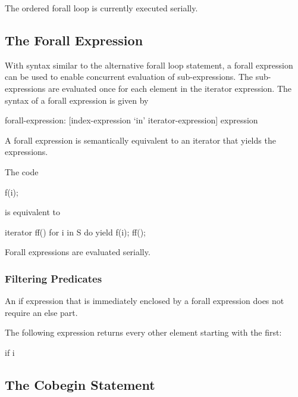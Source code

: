 \begin{status}
The ordered forall loop is currently executed serially.
\end{status}

\subsection{The Forall Expression}
\label{Forall_Expressions}

With syntax similar to the alternative forall loop statement, a forall
expression can be used to enable concurrent evaluation of
sub-expressions.  The sub-expressions are evaluated once for each
element in the iterator expression.  The syntax of a forall expression
is given by
\begin{syntax}
forall-expression:
   [index-expression `in' iterator-expression] expression
\end{syntax}

A forall expression is semantically equivalent to an iterator that
yields the expressions.

\begin{example}
The code
\begin{chapel}
[i in S] f(i);
\end{chapel}
is equivalent to
\begin{chapel}
iterator ff() {
  for i in S do
    yield f(i);
}
ff();
\end{chapel}
\end{example}

\begin{status}
Forall expressions are evaluated serially.
\end{status}

\subsubsection{Filtering Predicates}
\label{Filtering_Predicates}

An if expression that is immediately enclosed by a forall expression
does not require an else part.
\begin{example}
The following expression returns every other element starting with the
first:
\begin{chapel}
[i in 1..s.length] if i %
\end{chapel}
\end{example}

\subsection{The Cobegin Statement}
\label{Cobegin}

